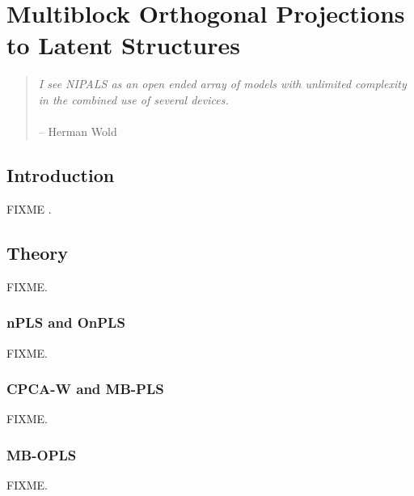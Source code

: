 
\chapter{Multiblock Orthogonal Projections to Latent Structures}

\begin{quote}
{\it
  I see NIPALS as an open ended array of models with unlimited complexity
  in the combined use of several devices.}
\\\\
 -- Herman Wold
\end{quote}

\section{Introduction}

\begin{doublespace}
FIXME \cite{westerhuis:jchemo1998}.
\end{doublespace}

\section{Theory}

\begin{doublespace}
FIXME.
\end{doublespace}

\subsection{nPLS and OnPLS}

\begin{doublespace}
FIXME.
\end{doublespace}

\subsection{CPCA-W and MB-PLS}

\begin{doublespace}
FIXME.
\end{doublespace}

\subsection{MB-OPLS}

\begin{doublespace}
FIXME.
\end{doublespace}

